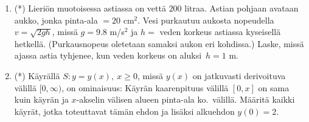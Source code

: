 \begin{enumerate}
\item (*)
Lieriön muotoisessa astiassa on vettä $200$ litraa. Astian pohjaan avataan aukko, jonka
pinta-ala $=20$ cm$^2$. Vesi purkautuu aukosta nopeudella $v=\sqrt{2gh}$, missä
$g=9.8$ m/s$^2$ ja $h=$ veden korkeus astiassa kyseisellä hetkellä. (Purkausnopeus oletetaan
samaksi aukon eri kohdissa.) Laske, missä ajassa astia tyhjenee, kun veden korkeus on aluksi
$\,h=1$ m.

\item (*)
Käyrällä $S: y=y(x),\ x \ge 0$, missä $y(x)$ on jatkuvasti derivoituva välillä $[0,\infty)$,
on ominaisuus: Käyrän kaarenpituus välillä $[0,x]$ on sama kuin käyrän ja $x$-akselin välisen
alueen pinta-ala ko.\ välillä. Määritä kaikki käyrät, jotka toteuttavat tämän ehdon ja lisäksi
alkuehdon $y(0)=2$.

\end{enumerate}
